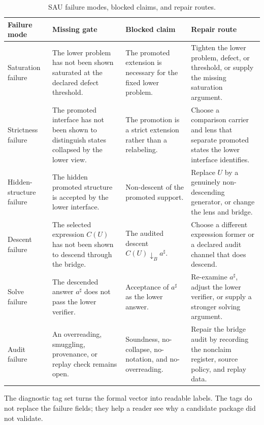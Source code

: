 \documentclass[11pt]{article}
\theoremstyle{definition}
\begin{document}
\begingroup\begin{table}[tbp]
\centering
\footnotesize
\caption{SAU failure modes, blocked claims, and repair routes.}
\label{tab:failure-modes}
\begin{tabularx}{\textwidth}{@{}>{\raggedright\arraybackslash}p{}>{\raggedright\arraybackslash}X>{\raggedright\arraybackslash}X>{\raggedright\arraybackslash}X@{}}
\toprule
Failure mode & Missing gate & Blocked claim & Repair route \\
\midrule
Saturation failure &
The lower problem has not been shown saturated at the declared defect threshold. &
The promoted extension is necessary for the fixed lower problem. &
Tighten the lower problem, defect, or threshold, or supply the missing saturation argument. \\
Strictness failure &
The promoted interface has not been shown to distinguish states collapsed by the lower view. &
The promotion is a strict extension rather than a relabeling. &
Choose a comparison carrier and lens that separate promoted states the lower interface identifies. \\
Hidden-structure failure &
The hidden promoted structure is accepted by the lower interface. &
Non-descent of the promoted support. &
Replace \(U\) by a genuinely non-descending generator, or change the lens and bridge. \\
Descent failure &
The selected expression \(C(U)\) has not been shown to descend through the bridge. &
The audited descent \(C(U)\downarrow_B a^\sharp\). &
Choose a different expression former or a declared audit channel that does descend. \\
Solve failure &
The descended answer \(a^\sharp\) does not pass the lower verifier. &
Acceptance of \(a^\sharp\) as the lower answer. &
Re-examine \(a^\sharp\), adjust the lower verifier, or supply a stronger solving argument. \\
Audit failure &
An overreading, smuggling, provenance, or replay check remains open. &
Soundness, no-collapse, no-notation, and no-overreading. &
Repair the bridge audit by recording the nonclaim register, source policy, and replay data. \\
\bottomrule
\end{tabularx}
\end{table}
 \endgroup

The diagnostic tag set turns the formal vector into readable labels.  The tags
do not replace the failure fields; they help a reader see why a candidate
package did not validate.
\end{document}
